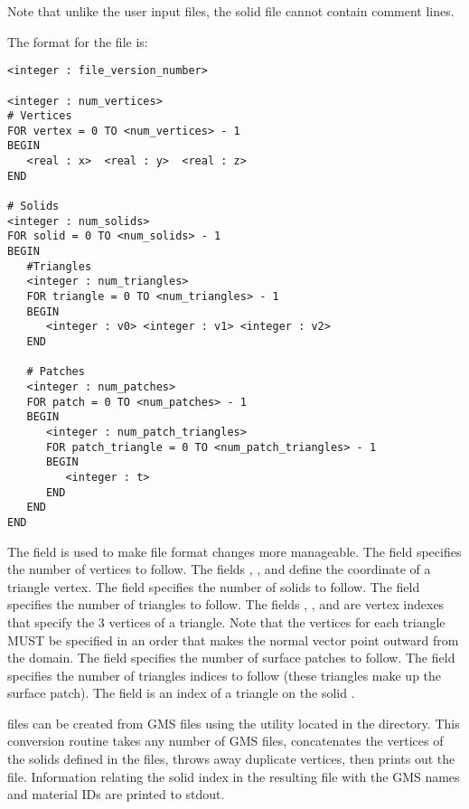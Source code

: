 Note that unlike the user input files, the solid file cannot contain comment
lines. 

The format for the file is:

\begin{display}\begin{verbatim}
<integer : file_version_number>

<integer : num_vertices>
# Vertices
FOR vertex = 0 TO <num_vertices> - 1
BEGIN
   <real : x>  <real : y>  <real : z>
END

# Solids
<integer : num_solids>
FOR solid = 0 TO <num_solids> - 1
BEGIN
   #Triangles
   <integer : num_triangles>
   FOR triangle = 0 TO <num_triangles> - 1
   BEGIN
      <integer : v0> <integer : v1> <integer : v2>
   END

   # Patches
   <integer : num_patches>
   FOR patch = 0 TO <num_patches> - 1
   BEGIN
      <integer : num_patch_triangles>
      FOR patch_triangle = 0 TO <num_patch_triangles> - 1
      BEGIN
         <integer : t>
      END
   END
END
\end{verbatim}\end{display}

\noindent
The field  is used to make file format changes
more manageable.
The field  specifies the number of vertices to follow.
The fields , , and  define the coordinate
of a triangle vertex.
The field  specifies the number of solids to follow.
The field  specifies the number of triangles to follow.
The fields , , and  are vertex indexes
that specify the 3 vertices of a triangle.  Note that the vertices for each
triangle MUST be specified in an order that makes the normal vector point
outward from the domain.
The field  specifies the number of surface patches
to follow.
The field  specifies the number of triangles
indices to follow (these triangles make up the surface patch).
The field  is an index of a triangle on the solid .

\parflow{}  files can be created from GMS 
files using the utility  located in the
 directory.
This conversion routine takes any number of GMS  files,
concatenates the vertices of the solids defined in the files, throws
away duplicate vertices, then prints out the  file.
Information relating the solid index in the resulting 
file with the GMS names and material IDs are printed to stdout.

